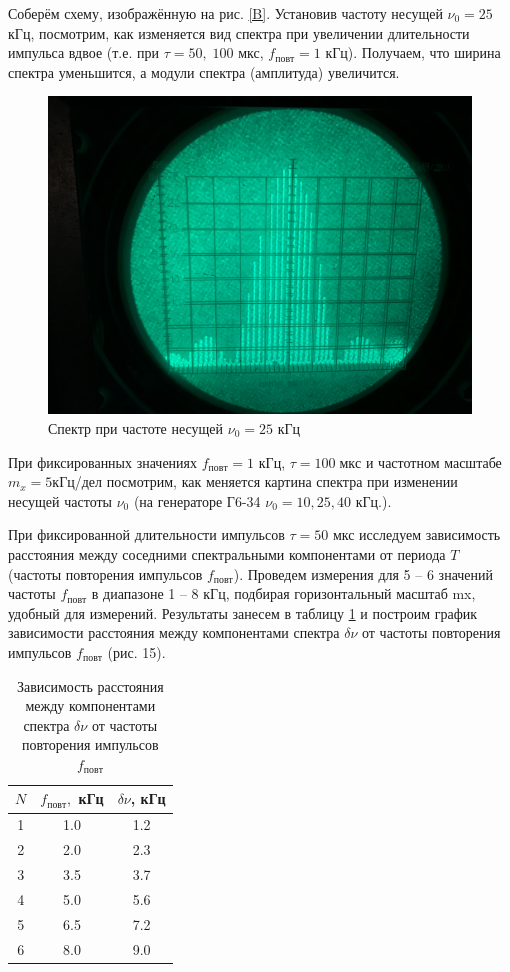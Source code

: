 \documentclass[a4paper, 14pt]{extarticle}%
\begin{document}
  	Соберём схему, изображённую на рис. \ref{B}. Установив частоту несущей $ \nu_0 = 25  $ кГц, посмотрим, как изменяется вид спектра при увеличении длительности импульса вдвое (т.е. при $ \tau = 50, \; 100 $ мкс, $ f_{повт} = 1 $ кГц). Получаем, что ширина спектра уменьшится, а модули спектра (амплитуда) увеличится. 
  	
  	 \begin{figure}[h]
  		\centering
  		\includegraphics[width=0.65\linewidth]{pictures/B_25.jpg}
  		\caption{Спектр при частоте несущей $ \nu_0 = 25 $ кГц}
  		\label{B_25}
  	\end{figure}
  	
  	При фиксированных значениях $  f_{повт} = 1 $ кГц, $ \tau= 100 \; мкс $ и частотном масштабе $ m_x = 5  $кГц/дел посмотрим, как меняется картина спектра при изменении несущей частоты $ \nu_0 $ (на генераторе Г6-34 $ \nu_0 = 10, 25, 40 $ кГц.). 
  	

  	При фиксированной длительности импульсов  $ \tau = 50 $ мкс исследуем зависимость расстояния между соседними спектральными компонентами
  	от периода $ T $ (частоты повторения импульсов $ f_{повт} $). Проведем измерения для 5 -- 6 значений частоты $ f_{повт} $ в диапазоне 1 -- 8 кГц, подбирая горизонтальный масштаб mx, удобный для измерений. Результаты занесем в таблицу \ref{B_table} и построим график зависимости расстояния между компонентами спектра $ \delta \nu $ от частоты повторения импульсов $ f_{повт} $ (рис. 15). 
  
  	\begin{table}[]
  		\caption{Зависимость расстояния между компонентами спектра $ \delta \nu $ от частоты повторения импульсов $ f_{повт} $}
  		\begin{center}
  			\begin{tabular}{|c|c|c|}
  				\hline
  				$ N $  & $ f_{повт}, $ кГц  & $ \delta \nu $, кГц \\
  				\hline
  				1 & 1.0 & 1.2 \\
  					\hline
  				2 & 2.0 & 2.3 \\
  					\hline
  				3 & 3.5 & 3.7 \\
  					\hline
  				4 & 5.0 & 5.6 \\
  					\hline
  				5 & 6.5 & 7.2 \\
  					\hline
  				6 & 8.0 & 9.0 \\
  				\hline
  			\end{tabular}
  		\end{center}
  		\label{B_table}
  	\end{table}
  	
\end{document}
